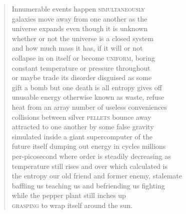\documentclass[times,12pt]{book}
\begin{document}
\begin{verse}
\begin{center}
Innumerable events happen \textsc{simultaneously}\\
galaxies move away from one another as the\\
universe expands even though it is unknown\\
whether or not the universe is a closed system\\
and how much mass it has, if it will or not\\
collapse in on itself or become \textsc{uniform}, boring\\
constant temperature or pressure throughout\\
or maybe trade its disorder disguised as some\\
gift a bomb but one death is all entropy gives off\\
unusable energy otherwise known as waste, refuse\\
heat from an array number of useless conveniences\\
collisions between silver \textsc{pellets} bounce away\\
attracted to one another by some false gravity\\
simulated inside a giant supercomputer of the\\
future itself dumping out energy in cycles millions\\
per-picosecond where order is steadily decreasing as\\
temperature still rises and over which calculated is\\
the entropy our old friend and former enemy, stalemate\\
baffling us teaching us and befriending us fighting\\
while the pepper plant still inches up\\
\textsc{grasping} to wrap itself around the sun.\\
\end{center}
\end{verse}
\newpage
\end{document}
